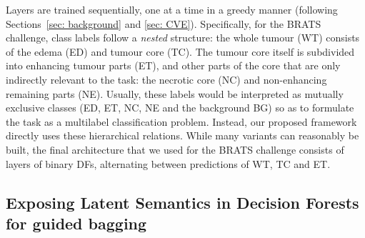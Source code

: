 Layers are trained sequentially, one at a time in a greedy manner (following Sections~\ref{sec: background} and 
\ref{sec: CVE}). 
Specifically, for the BRATS challenge, class labels follow a \textit{nested} structure: the whole tumour (WT) 
consists of the edema (ED) and tumour core (TC). The tumour core itself is subdivided into enhancing 
tumour parts (ET), and other parts of the core that are only indirectly relevant to the task: 
the necrotic core (NC) and non-enhancing remaining parts (NE). Usually, 
these labels would be interpreted as mutually exclusive classes (ED, ET, NC, NE and the background BG) 
so as to formulate the task as a multilabel classification problem. 
Instead, our proposed framework directly uses these hierarchical relations. %
While many variants can reasonably be built, the final architecture that we used for the BRATS challenge consists of layers of binary DFs, alternating between predictions of WT, TC and ET.


\subsection{Exposing Latent Semantics in Decision Forests for guided bagging}
\label{sec: clustering}


